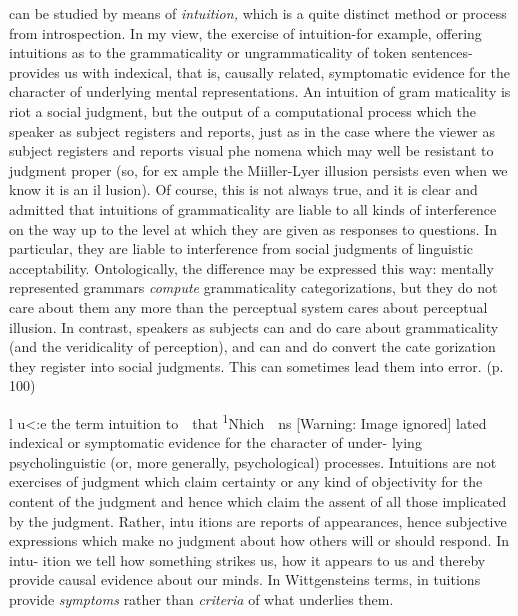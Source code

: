 \begin{styleStandard}
 can be studied by means of \textit{intuition,}\textit{ }which is a quite distinct method or process from introspection. In my view, the exercise of intuition-for example, offering intuitions as to the grammaticality or ungrammaticality of token sentences-provides us with indexical, that is, causally related, symptomatic evidence for the character of underlying mental representations. An intuition of gram\- maticality is riot a social judgment, but the output of a computational process which the speaker as subject registers and reports, just as in the case where the viewer as subject registers and reports visual phe\- nomena which may well be resistant to judgment proper (so, for ex\- ample the Miiller-Lyer illusion persists even when we know it is an il\- lusion). Of course, this is not always true, and it is clear and admitted that intuitions of grammaticality are liable to all kinds of interference {\textquotesingle}on the way up{\textquotesingle} to the level at which they are given as responses to questions. In particular, they are liable to interference from social judgments of linguistic acceptability. Ontologically, the difference may be expressed this way: mentally represented grammars \textit{compute}\textit{ }grammaticality categorizations, but they do not care about them any more than the perceptual system cares about perceptual illusion. In contrast, speakers as subjects can and do care about grammaticality (and the veridicality of perception), and can and do convert the cate\- gorization they register into social judgments. This can sometimes lead them into error. (p. 100)
\end{styleStandard}


\begin{styleStandard}
l u{\textless}:e the term {\textquotesingle}intuition{\textquotesingle} to\ \ that \textsuperscript{1}Nhich\ \ ns   [Warning: Image ignored] %
 \textsubscript{ }lated indexical or symptomatic evidence for the character of under- lying psycholinguistic (or, more generally, psychological) processes. Intuitions are not exercises of judgment which claim certainty or any kind of objectivity for the content of the judgment and hence which claim the assent of all those implicated by the judgment. Rather, intu\- itions are reports of appearances, hence subjective expressions which make no judgment about how others will or should respond. In intu- ition we tell how something strikes us, how it appears to us and thereby provide causal evidence about our minds. In Wittgenstein{\textquotesingle}s terms, in\- tuitions provide \textit{symptoms}\textit{ }rather than \textit{criteria}\textit{ }of what underlies them.
\end{styleStandard}


